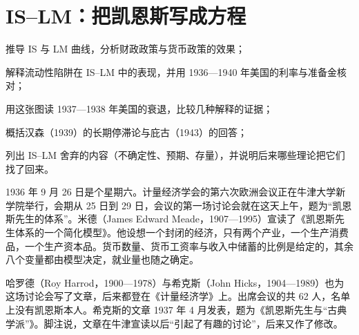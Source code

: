 \chapter{IS–LM：把凯恩斯写成方程}\label{ch:islm}

\begin{chapterguide}
\begin{guidegoals}
\item 推导 IS 与 LM 曲线，分析财政政策与货币政策的效果；
\item 解释流动性陷阱在 IS–LM 中的表现，并用 1936—1940 年美国的利率与准备金核对；
\item 用这张图读 1937—1938 年美国的衰退，比较几种解释的证据；
\item 概括汉森（1939）的长期停滞论与庇古（1943）的回答；
\item 列出 IS–LM 舍弃的内容（不确定性、预期、存量），并说明后来哪些理论把它们找了回来。
\end{guidegoals}
\end{chapterguide}

1936 年 9 月 26 日是个星期六。计量经济学会的第六次欧洲会议正在牛津大学新学院举行，会期从 25 日到 29 日，会议的第一场讨论会就在这天上午，题为“凯恩斯先生的体系”\cite{oxford1937}。米德（James Edward Meade，1907—1995）宣读了《凯恩斯先生体系的一个简化模型》\cite{oxford1937,loc33}。他设想一个封闭的经济，只有两个产业，一个生产消费品，一个生产资本品\cite{oxford1937}。货币数量、货币工资率与收入中储蓄的比例是给定的，其余八个变量都由模型决定，就业量也随之确定\cite{oxford1937}。

哈罗德（Roy Harrod，1900—1978）与希克斯（John Hicks，1904—1989）也为这场讨论会写了文章，后来都登在《计量经济学》上\cite{oxford1937,loc33}。出席会议的共 62 人，名单上没有凯恩斯本人\cite{oxford1937}。希克斯的文章 1937 年 4 月发表，题为《凯恩斯先生与“古典学派”》\cite{hicks1937}。脚注说，文章在牛津宣读以后“引起了有趣的讨论”，后来又作了修改\cite{hicks1937}。

